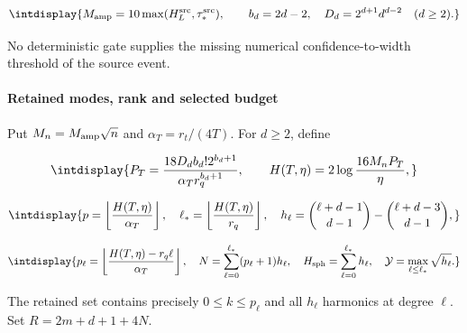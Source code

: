 \begingroup\renewcommand{\theHequation}{intdisplay.238}
\begin{equation*}
\intdisplay{
M_{\rm amp}=10\max(H_L^{\rm src},\tau_*^{\rm src}),\qquad
b_d=2d-2,\quad D_d=2^{d+1}d^{d-2}\quad(d\ge2).
}
\end{equation*}
\endgroup


No deterministic gate supplies the missing numerical confidence-to-width threshold of the source event.


\paragraph{Retained modes, rank and selected budget}
\label{int:setup-orders-detail-5}
\mbox{}\par\smallskip


Put \(M_n=M_{\rm amp}\sqrt n\) and \(\alpha_T=r_t/(4T)\). For \(d\ge2\), define


\begingroup\renewcommand{\theHequation}{intdisplay.239}
\begin{equation*}
\intdisplay{
P_T=\frac{18D_db_d!2^{b_d+1}}{\alpha_T r_q^{b_d+1}},\qquad
H(T,\eta)=2\log\frac{16M_nP_T}{\eta},
}
\end{equation*}
\endgroup

\begingroup\renewcommand{\theHequation}{intdisplay.240}
\begin{equation*}
\intdisplay{
p=\left\lfloor\frac{H(T,\eta)}{\alpha_T}\right\rfloor,\quad
\ell_*=\left\lfloor\frac{H(T,\eta)}{r_q}\right\rfloor,\quad
h_\ell=\binom{\ell+d-1}{d-1}-\binom{\ell+d-3}{d-1},
}
\end{equation*}
\endgroup

\begingroup\renewcommand{\theHequation}{intdisplay.241}
\begin{equation*}
\intdisplay{
p_\ell=\left\lfloor\frac{H(T,\eta)-r_q\ell}{\alpha_T}\right\rfloor,
\quad
N=\sum_{\ell=0}^{\ell_*}(p_\ell+1)h_\ell,\quad
H_{\rm sph}=\sum_{\ell=0}^{\ell_*}h_\ell,\quad
\mathcal Y=\max_{\ell\le\ell_*}\sqrt{h_\ell}.
}
\end{equation*}
\endgroup


The retained set contains precisely \(0\le k\le p_\ell\) and all \(h_\ell\) harmonics at degree \(\ell\). Set \(R=2m+d+1+4N\).


